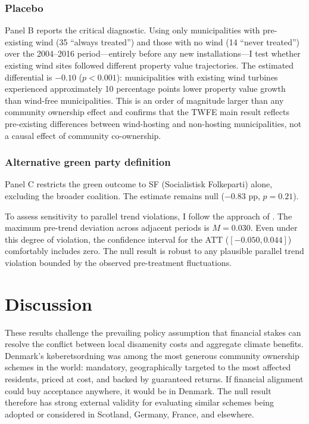 \documentclass[12pt]{article}
\begin{document}
\subsubsection*{Placebo} Panel B reports the critical diagnostic. Using only municipalities with pre-existing wind (35 ``always treated'') and those with no wind (14 ``never treated'') over the 2004--2016 period---entirely before any new installations---I test whether existing wind sites followed different property value trajectories. The estimated differential is $-0.10$ ($p < 0.001$): municipalities with existing wind turbines experienced approximately 10 percentage points lower property value growth than wind-free municipalities. This is an order of magnitude larger than any community ownership effect and confirms that the TWFE main result reflects pre-existing differences between wind-hosting and non-hosting municipalities, not a causal effect of community co-ownership.

\subsubsection*{Alternative green party definition} Panel C restricts the green outcome to SF (Socialistisk Folkeparti) alone, excluding the broader coalition. The estimate remains null ($-0.83$ pp, $p = 0.21$).

To assess sensitivity to parallel trend violations, I follow the approach of \citet{RambachanRoth2023}. The maximum pre-trend deviation across adjacent periods is $M = 0.030$. Even under this degree of violation, the confidence interval for the ATT ($[-0.050, 0.044]$) comfortably includes zero. The null result is robust to any plausible parallel trend violation bounded by the observed pre-treatment fluctuations.




\section{Discussion}

These results challenge the prevailing policy assumption that financial stakes can resolve the conflict between local disamenity costs and aggregate climate benefits. Denmark's k{\o}beretsordning was among the most generous community ownership schemes in the world: mandatory, geographically targeted to the most affected residents, priced at cost, and backed by guaranteed returns. If financial alignment could buy acceptance anywhere, it would be in Denmark. The null result therefore has strong external validity for evaluating similar schemes being adopted or considered in Scotland, Germany, France, and elsewhere.
\end{document}
